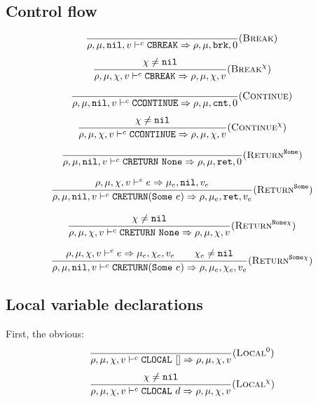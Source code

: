 \subsection{Control flow}
\[\dfrac{
}{\rho,\mu,\texttt{nil},v \vdash^c \texttt{CBREAK} \Rightarrow \rho,\mu,\texttt{brk},0} (\textsc{Break})\]
\[\dfrac{\begin{array}{c}
    \chi\ne\texttt{nil}
\end{array}}{\rho,\mu,\chi,v \vdash^c \texttt{CBREAK} \Rightarrow \rho,\mu,\chi,v} (\textsc{Break}^\chi)\]

\[\dfrac{
}{\rho,\mu,\texttt{nil},v \vdash^c \texttt{CCONTINUE} \Rightarrow \rho,\mu,\texttt{cnt},0} (\textsc{Continue})\]
\[\dfrac{\begin{array}{c}
    \chi\ne\texttt{nil}
\end{array}}{\rho,\mu,\chi,v \vdash^c \texttt{CCONTINUE} \Rightarrow \rho,\mu,\chi,v} (\textsc{Continue}^\chi)\]

\[\dfrac{
}{\rho,\mu,\texttt{nil},v \vdash^c \texttt{CRETURN}\ \texttt{None} \Rightarrow \rho,\mu,\texttt{ret},0} (\textsc{Return}^{\texttt{None}})\]

\[\dfrac{\begin{array}{c}
    \rho,\mu,\chi,v \vdash^e e \Rightarrow \mu_e,\texttt{nil},v_e
\end{array}}{\rho,\mu,\texttt{nil},v \vdash^c \texttt{CRETURN}(\texttt{Some}\ e) \Rightarrow \rho,\mu_e,\texttt{ret},v_e} (\textsc{Return}^{\texttt{Some}})\]

\[\dfrac{\begin{array}{c}
    \chi\ne\texttt{nil}
\end{array}}{\rho,\mu,\chi,v \vdash^c \texttt{CRETURN}\ \texttt{None} \Rightarrow \rho,\mu,\chi,v} (\textsc{Return}^{\texttt{None}\chi})\]

\[\dfrac{\begin{array}{c}
    \rho,\mu,\chi,v \vdash^e e \Rightarrow \mu_e,\chi_e,v_e \qquad \chi_e\ne\texttt{nil}
\end{array}}{\rho,\mu,\texttt{nil},v \vdash^c \texttt{CRETURN}(\texttt{Some}\ e) \Rightarrow \rho,\mu_e,\chi_e,v_e} (\textsc{Return}^{\texttt{Some}\chi})\]

\subsection{Local variable declarations}

First, the obvious:
\[\dfrac{\begin{array}{c}
\end{array}}{\rho,\mu,\chi,v \vdash^c \texttt{CLOCAL}\ [] \Rightarrow \rho,\mu,\chi,v} (\textsc{Local}^0)\]
\[\dfrac{\begin{array}{c}
    \chi\ne\texttt{nil}
\end{array}}{\rho,\mu,\chi,v \vdash^c \texttt{CLOCAL}\ d \Rightarrow \rho,\mu,\chi,v} (\textsc{Local}^\chi)\]

